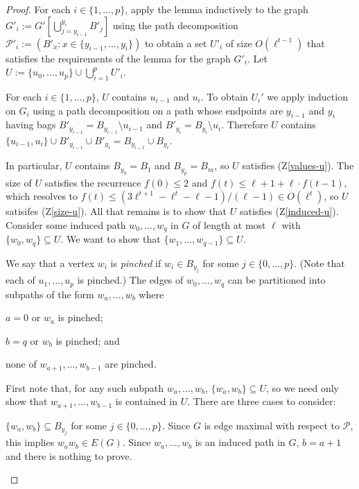 \documentclass[kpfonts]{patmorin}
\theoremstyle{named}
\begin{document}
\begin{proof}
    For each $i\in\{1,\ldots,p\}$, apply the lemma inductively to the graph $G'_i:=G'[\bigcup_{j=y_{i-1}}^{y_i}B'_j]$ using the path decomposition $\mathcal{P}'_i:=(B'_x:x\in\{y_{i-1},\ldots,y_i\})$ to obtain a set $U'_i$ of size $O(\ell^{t-1})$ that satisfies the requirements of the lemma for the graph $G'_i$. Let $U:=\{u_0,\ldots,u_p\}\cup\bigcup_{i=1}^p U'_i$.

    For each $i\in\{1,\ldots,p\}$, $U$ contains $u_{i-1}$ and $u_i$.
    To obtain $U_i'$ we apply induction on $G_i$ using a path decomposition on a path whose endpoints are $y_{i-1}$ and $y_i$ having bags $B'_{y_{i-1}}=B_{y_{i-1}}\setminus u_{i-1}$ and $B'_{y_{i}}=B_{y_{i}}\setminus u_{i}$.  Therefore $U$ contains $\{u_{i-1},u_i\}\cup B'_{y_{i-1}}\cup B'_{y_i}=B_{y_{i-1}}\cup B_{y_i}$.

    In particular, $U$ contains $B_{y_0}=B_1$ and $B_{y_p}=B_m$, so $U$ satisfies (Z\ref{values-u}). The size of $U$ satisfies the recurrence $f(0)\le 2$ and $f(t)\le \ell+1+\ell\cdot f(t-1)$, which resolves to $f(t)\le (3\ell^{t+1}-\ell^t-\ell-1)/(\ell-1) \in O(\ell^t)$, so $U$ satisifes (Z\ref{size-u}).  All that remains is to show that $U$ satisfies (Z\ref{induced-u}).  Consider some induced path $w_0,\ldots,w_q$ in $G$ of length at most $\ell$ with $\{w_0,w_q\}\subseteq U$.  We want to show that $\{w_1,\ldots,w_{q-1}\}\subseteq U$.

    We say that a vertex $w_i$ is \emph{pinched} if $w_i\in B_{y_j}$ for some $j\in\{0,\ldots,p\}$. (Note that each of $u_1,\ldots,u_p$ is pinched.) The edges of $w_0,\ldots,w_q$ can be partitioned into subpaths of the form $w_{a},\ldots,w_{b}$ where
    \begin{inparaenum}[(i)]
        \item $a=0$ or $w_a$ is pinched;
        \item $b=q$ or $w_b$ is pinched; and
        \item none of $w_{a+1},\ldots,w_{b-1}$ are pinched.
    \end{inparaenum}
    First note that, for any such subpath $w_a,\ldots,w_b$, $\{w_a,w_b\}\subseteq U$, so we need only show that $w_{a+1},\ldots,w_{b-1}$ is contained in $U$.  There are three cases to consider:

    \begin{compactenum}
       \item $\{w_a,w_b\}\subseteq B_{y_j}$ for some $j\in\{0,\ldots,p\}$.  Since $G$ is edge maximal with respect to $\mathcal{P}$, this implies  $w_aw_b\in E(G)$. Since $w_a,\ldots,w_b$ is an induced path in $G$, $b=a+1$ and there is nothing to prove.


\end{compactenum}
\end{proof}
\end{document}
